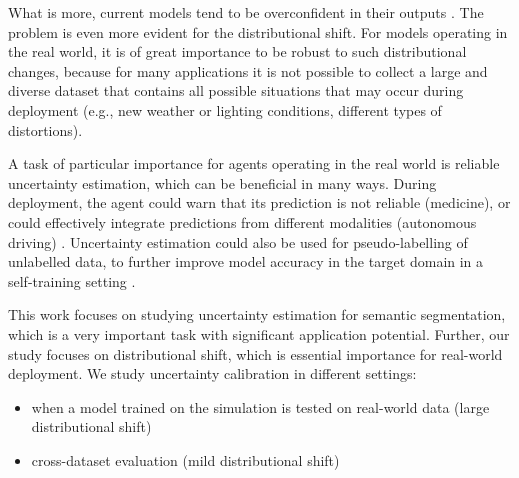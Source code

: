 \documentclass[conference]{IEEEtran}
\begin{document}
What is more, current models tend to be overconfident in their outputs \cite{calibration}. The problem is even more evident for the distributional shift\cite{trustuncertainty}. For models operating in the real world, it is of great importance to be robust to such distributional changes, because for many applications it is not possible to collect a large and diverse dataset that contains all possible situations that may occur during deployment (e.g., new weather or lighting conditions, different types of distortions).

A task of particular importance for agents operating in the real world is reliable uncertainty estimation, which can be beneficial in many ways. During deployment, the agent could warn that its prediction is not reliable (medicine), or could effectively integrate predictions from different modalities (autonomous driving) \cite{multi}. Uncertainty estimation could also be used for pseudo-labelling of unlabelled data, to further improve model accuracy in the target domain in a self-training setting \cite{noisystudent}.

This work focuses on studying uncertainty estimation for semantic segmentation, which is a very important task with significant application potential. Further, our study focuses on distributional shift, which is essential importance for real-world deployment. We study uncertainty calibration in different settings:
\begin{itemize}
    \item when a model trained on the simulation is tested on real-world data (large distributional shift)
    \item cross-dataset evaluation (mild distributional shift)
\end{itemize}
\end{document}
